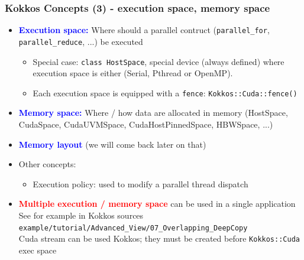 \begin{frame}
  \frametitle{Kokkos Concepts (3) - execution space, memory space}

  \begin{itemize}
  \item \textcolor{blue}{\textbf{Execution space:}} Where should a parallel contruct (\texttt{parallel\_for}, \texttt{parallel\_reduce}, ...) be executed\\
    \begin{itemize}
    \item Special case: \texttt{class HostSpace}, special device (always defined) where execution space is either (Serial, Pthread or OpenMP).
    \item Each execution space is equipped with a \texttt{fence}: \texttt{Kokkos::Cuda::fence()}
    \end{itemize}
  \item \textcolor{blue}{\textbf{Memory space:}} Where / how data are allocated in memory (HostSpace, CudaSpace, CudaUVMSpace, CudaHostPinnedSpace, HBWSpace, ...)
  \item \textcolor{blue}{\textbf{Memory layout}} (we will come back later on that)
  \item Other concepts:
    \begin{itemize}
    \item Execution policy: used to modify a parallel thread dispatch
    \end{itemize}
  \item \textcolor{red}{\bf Multiple execution / memory space} can be used in a single application\\
    See for example in Kokkos sources \texttt{example/tutorial/Advanced\_View/07\_Overlapping\_DeepCopy}\\
    Cuda stream can be used Kokkos; they must be created before {\tt Kokkos::Cuda} exec space
  \end{itemize}

\end{frame}
